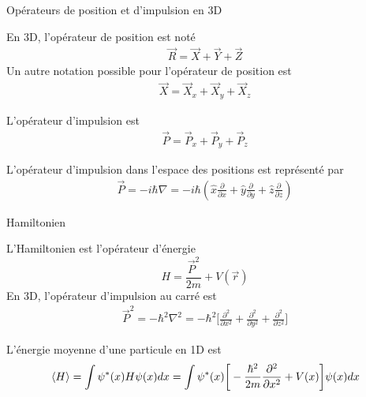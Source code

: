 \documentclass[xcolor=svgnames,t,aspectratio=169,handout]{uqtrcours}
\begin{document}
\begin{frame}{Opérateurs de position et d'impulsion en 3D}

En 3D, l'opérateur de position est noté
\begin{align}
  \vec R = \vec X + \vec Y + \vec Z
\end{align}
Un autre notation possible pour l'opérateur de position est
\begin{align}
  \vec X
  = \vec X_x + \vec X_y + \vec X_z
\end{align}

L'opérateur d'impulsion est
\begin{align}
  \vec P = \vec P_x + \vec P_y + \vec P_z
\end{align}

L'opérateur d'impulsion dans l'espace des positions est représenté par
\begin{align}
  \vec P 
  =
  -i\hbar \nabla
  =
  -i \hbar \left(
    \hat x \frac{\partial}{\partial x}
  + \hat y \frac{\partial}{\partial y}
  + \hat z \frac{\partial}{\partial z}
  \right)
\end{align}
%

\end{frame}



\begin{frame}{Hamiltonien}

L'Hamiltonien est l'opérateur d'énergie
\begin{equation}
  H = \frac{\vec P^2}{2m} + V(\vec r)
\end{equation}
En 3D, l'opérateur d'impulsion au carré est
\begin{align}
  \vec P^2
  =
  -\hbar^2 \nabla^2
  =
  -\hbar^2 \bigg[
    \frac{\partial^2}{\partial x^2}
  + \frac{\partial^2}{\partial y^2}
  + \frac{\partial^2}{\partial z^2}
  \bigg]
\end{align}

L'énergie moyenne d'une particule en 1D est
\begin{align}
  \braket{H}
  =
  \int \psi^*(x) H \psi(x) dx
  =
  \int
  \psi^*(x)
  \bigg[
    -\frac{\hbar^2}{2m} \frac{\partial^2}{\partial x^2} + V(x)
  \bigg]
  \psi(x)
  dx
\end{align}

\end{frame}
\end{document}

